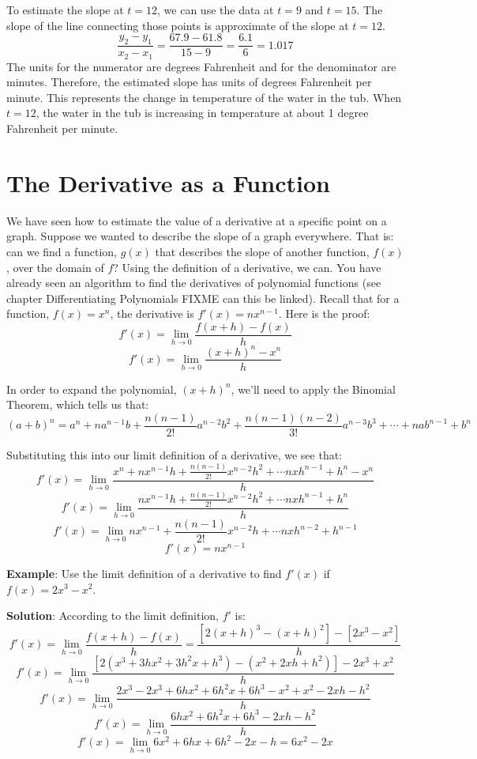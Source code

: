 \begin{Answer}[ref=slope1]
	To estimate the slope at $t = 12$, we can use the data at $t = 9$ and $t = 
	15$. The slope of the line connecting those points is approximate of the 
	slope at $t = 12$. $$\frac{y_2 - y_1}{x_2 - x_1} = \frac{67.9 - 61.8}{15 - 9} 
	= \frac{6.1}{6} = 1.017$$ The units for the numerator are degrees Fahrenheit 
	and for the denominator are minutes. Therefore, the estimated slope has units 
	of degrees Fahrenheit per minute. This represents the change in temperature 
	of the water in the tub. When $t = 12$, the water in the tub is increasing in 
	temperature at about 1 degree Fahrenheit per minute. 
\end{Answer}

\section{The Derivative as a Function}
We have seen how to estimate the value of a derivative at a specific point on 
a graph. Suppose we wanted to describe the slope of a graph everywhere. That 
is: can we find a function, $g(x)$ that describes the slope of another 
function, $f(x)$, over the domain of $f$? Using the definition of a 
derivative, we can.
You have already seen an algorithm to find the derivatives of polynomial 
functions (see chapter Differentiating Polynomials FIXME can this be linked). Recall that for a 
function, $f(x) = x^n$, the derivative is $f'(x) = nx^{n - 1}$. Here is the 
proof:
$$f'(x) = \lim_{h \to 0} \frac{f(x + h) - f(x)}{h}$$
$$f'(x) = \lim_{h \to 0} \frac{(x + h)^n - x^n}{h}$$

In order to expand the polynomial, $(x + h)^n$, we'll need to apply the 
Binomial Theorem, which tells us that:
$$(a + b)^n = a^n + na^{n - 1}b + \frac{n(n - 1)}{2!}a^{n - 2}b^2 + \frac{n(n 
- 1)(n - 2)}{3!}a^{n - 3}b^3 + \cdots + nab^{n - 1} + b^n$$

Substituting this into our limit definition of a derivative, we see that:
$$f'(x) = \lim_{h \to 0} \frac{x^n + nx^{n-1}h + \frac{n(n-1)}{2!}x^{n-2}h^2 
+ \cdots nxh^{n-1} + h^n - x^n}{h}$$
$$f'(x) = \lim_{h \to 0} \frac{nx^{n-1}h + \frac{n(n-1)}{2!}x^{n-2}h^2 + 
\cdots nxh^{n-1} + h^n}{h}$$
$$f'(x) = \lim_{h \to 0} nx^{n-1} + \frac{n(n-1)}{2!}x^{n-2}h + \cdots nxh^{
n-2} + h^{n-1}$$
$$f'(x) = nx^{n-1}$$

\textbf{Example}: Use the limit definition of a derivative to find $f'(x)$ if 
$f(x) = 2x^3 - x^2$. 

\textbf{Solution}: According to the limit definition, $f'$ is:
$$f'(x) = \lim_{h \to 0} \frac{f(x + h) - f(x)}{h} = \frac{\left[ 2\left( x + 
h \right)^3 - \left( x + h \right)^2 \right] - \left[ 2x^3 - x^2 \right]}{h}$$
$$f'(x) = \lim_{h \to 0} \frac{\left[ 2 \left( x^3 + 3 h x^2 + 3 h^2 x + h^3 
\right) - \left( x^2 + 2xh + h^2 \right) \right] - 2 x^3 + x^2}{h}$$
$$f'(x) = \lim_{h \to 0} \frac{2x^3 - 2x^3 + 6 h x^2 + 6 h^2 x + 6 h^3 - x^2 + 
x^2 -2 x h - h^2}{h}$$
$$f'(x) = \lim_{h \to 0} \frac{6 h x^2 + 6 h^2 x + 6 h^3 - 2 x h - h^2}{h}$$
$$f'(x) = \lim_{h \to 0} 6 x^2 + 6 h x + 6 h^2 - 2x - h = 6 x^2 - 2 x$$

